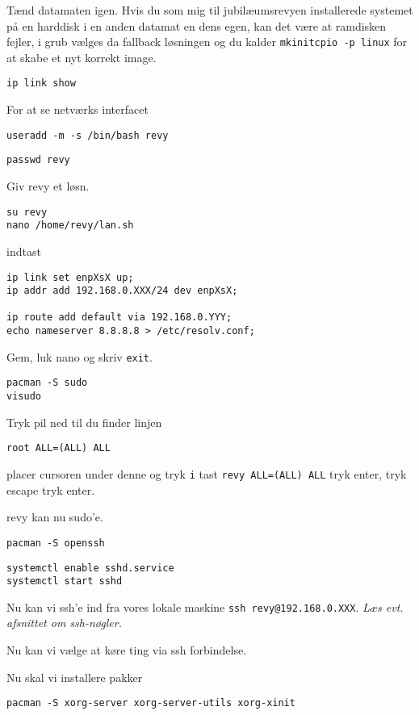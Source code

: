 \documentclass[10pt,a4paper,danish]{article}
\begin{document}
Tænd datamaten igen.
Hvis du som mig til jubilæumsrevyen installerede systemet på en harddisk i en
anden datamat en dens egen, kan det være at ramdisken fejler, i grub vælges da
fallback løsningen og du kalder \texttt{mkinitcpio -p linux} for at skabe et nyt
korrekt image.

\begin{verbatim}
ip link show
\end{verbatim}
For at se netværks interfacet

\begin{verbatim}
useradd -m -s /bin/bash revy
\end{verbatim}
\begin{verbatim}
passwd revy
\end{verbatim}
Giv revy et løsn.


\begin{verbatim}
su revy
nano /home/revy/lan.sh
\end{verbatim}
indtast
\begin{verbatim}
ip link set enpXsX up;
ip addr add 192.168.0.XXX/24 dev enpXsX;

ip route add default via 192.168.0.YYY;
echo nameserver 8.8.8.8 > /etc/resolv.conf;
\end{verbatim}
Gem, luk nano og skriv \texttt{exit}.

\begin{verbatim}
pacman -S sudo
visudo
\end{verbatim}
Tryk pil ned til du finder linjen
\begin{verbatim}
root ALL=(ALL) ALL
\end{verbatim}
placer cursoren under denne og tryk \texttt{i}
tast \texttt{revy ALL=(ALL) ALL} tryk enter, tryk escape
tryk  enter.

revy kan nu sudo'e.

\begin{verbatim}
pacman -S openssh
\end{verbatim}
\begin{verbatim}
systemctl enable sshd.service
systemctl start sshd
\end{verbatim}
Nu kan vi ssh'e ind fra vores lokale maskine \texttt{ssh revy@192.168.0.XXX}.
\textit{Læs evt. afsnittet om ssh-nøgler.}

Nu kan vi vælge at køre ting via ssh forbindelse.


Nu skal vi installere pakker
\begin{verbatim}
pacman -S xorg-server xorg-server-utils xorg-xinit
\end{verbatim}
\end{document}
